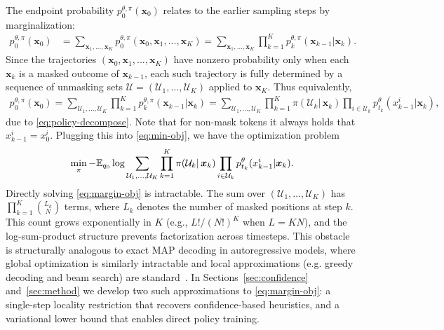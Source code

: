 The endpoint probability $p_0^{\theta,\pi}(\bm x_0)$ relates to the earlier sampling steps by marginalization:
\begin{align*}
    p_0^{\theta,\pi}(\bm x_0)&=\sum_{\bm x_1,...,\bm x_K}p_0^{\theta,\pi}(\bm x_0,\bm x_1,...,\bm x_K)=\sum_{\bm x_1,...,\bm x_K}\prod_{k=1}^Kp_k^{\theta,\pi}(\bm x_{k-1}|\bm x_k).
\end{align*}
Since the trajectories $(\bm x_0,\bm x_1,...,\bm x_K)$ have nonzero probability only when each $\bm x_k$ is a masked outcome of $\bm x_{k-1}$, each such trajectory is fully determined by a sequence of unmasking sets $\mathcal U=(\mathcal U_1,...,\mathcal U_K)$ applied to $\bm x_K$. Thus equivalently,
\begin{align*}
    p_0^{\theta,\pi}(\bm x_0)=\sum_{\mathcal U_1,...,\mathcal U_K}\prod_{k=1}^Kp_k^{\theta,\pi}(\bm x_{k-1}|\bm x_k)=\sum_{\mathcal U_1,...,\mathcal U_K}\prod_{k=1}^K\pi(\mathcal U_k|\,\bm x_k)\prod_{i\in\mathcal U_k}p^\theta_{t_k}(x_{k-1}^i|\bm x_k),
\end{align*}
due to \eqref{eq:policy-decompose}. Note that for non-mask tokens it always holds that $x^i_{k-1}=x^i_0$.
Plugging this into \eqref{eq:min-obj}, we have the optimization problem
\begin{align}\label{eq:margin-obj}
    \min_\pi-\mathbb{E}_{q_0}\log\sum_{\mathcal U_1,...,\mathcal U_K}\prod_{k=1}^K\pi(\mathcal U_k|\,\bm x_k)\prod_{i\in\mathcal U_k}p^\theta_{t_k}(x_{k-1}^i|\bm x_k).
\end{align}
Directly solving \eqref{eq:margin-obj} is intractable. The sum over $(\mathcal U_1, \ldots, \mathcal U_K)$ has $\prod_{k=1}^{K} \binom{L_k}{N}$ terms, where $L_k$ denotes the number of masked positions at step $k$. This count grows exponentially in $K$ (e.g., $L!/(N!)^K$ when $L = KN$), and the log-sum-product structure prevents factorization across timesteps. This obstacle is structurally analogous to exact MAP decoding in autoregressive models, where global optimization is similarly intractable and local approximations (e.g. greedy decoding and beam search) are standard~\citep{chen2025decodinggameminimaxoptimality,graves2012sequence,sutskever2014sequence,meister2020beam}. In Sections~\ref{sec:confidence} and~\ref{sec:method} we develop two such approximations to \eqref{eq:margin-obj}: a single-step locality restriction that recovers confidence-based heuristics, and a variational lower bound that enables direct policy training. 



